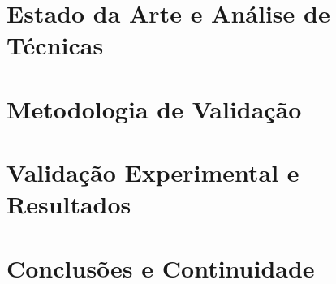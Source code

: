 \documentclass[12pt,Final,Portugues]{tese-FT}
\begin{document}
\chapter{Estado da Arte e Análise de Técnicas}


\chapter{Metodologia de Validação}


\chapter{Validação Experimental e Resultados}


\chapter{Conclusões e Continuidade}


\printbibliography[title=Referências Bibliográficas]

\appendix

\end{document}

